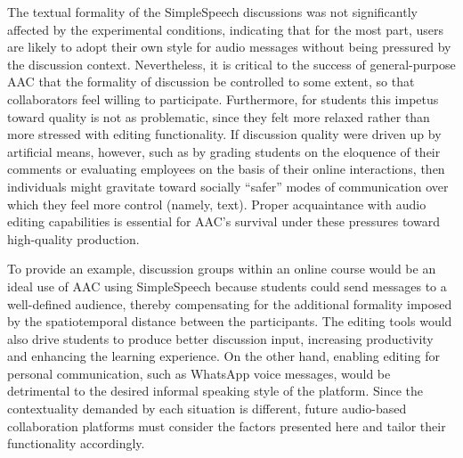 The textual formality of the SimpleSpeech discussions was not significantly affected by the experimental conditions, indicating that for the most part, users are likely to adopt their own style for audio messages without being pressured by the discussion context.
Nevertheless, it is critical to the success of general-purpose AAC that the formality of discussion be controlled to some extent, so that collaborators feel willing to participate.
Furthermore, for students this impetus toward quality is not as problematic, since they felt more relaxed rather than more stressed with editing functionality.
If discussion quality were driven up by artificial means, however, such as by grading students on the eloquence of their comments or evaluating employees on the basis of their online interactions, then individuals might gravitate toward socially ``safer'' modes of communication over which they feel more control (namely, text).
Proper acquaintance with audio editing capabilities is essential for AAC's survival under these pressures toward high-quality production.

To provide an example, discussion groups within an online course would be an ideal use of AAC using SimpleSpeech because students could send messages to a well-defined audience, thereby compensating for the additional formality imposed by the spatiotemporal distance between the participants. 
The editing tools would also drive students to produce better discussion input, increasing productivity and enhancing the learning experience.
On the other hand, enabling editing for personal communication, such as WhatsApp voice messages, would be detrimental to the desired informal speaking style of the platform.
Since the contextuality demanded by each situation is different, future audio-based collaboration platforms must consider the factors presented here and tailor their functionality accordingly.